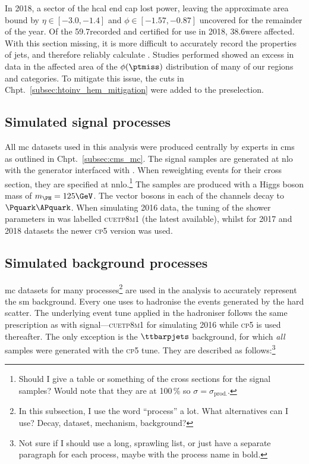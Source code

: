 In 2018, a sector of the \acrshort{hcal} end cap lost power, leaving the approximate area bound by $\eta \in [-\text{3.0}, -\text{1.4}]$ and $\phi \in [-\text{1.57}, -\text{0.87}]$ uncovered for the remainder of the year. Of the 59.7\fbinv recorded and certified for use in 2018, 38.6\fbinv were affected. With this section missing, it is more difficult to accurately record the properties of \glspl{jet}, and therefore reliably calculate \ptmiss. Studies performed showed an excess in data in the affected area of the $\phi(\ptmiss)$ distribution of many of our regions and categories. To mitigate this issue, the cuts in Chpt.~\ref{subsec:htoinv_hem_mitigation} were added to the preselection.




\subsection{Simulated signal processes}
\label{subsec:htoinv_signal}

All \acrlong{mc} datasets used in this analysis were produced centrally by experts in \acrshort{cms} as outlined in Chpt.~\ref{subsec:cms_mc}. The signal samples are generated at \acrshort{nlo} with the \POWHEG generator interfaced with \PYTHIAEIGHT. When reweighting events for their cross section, they are specified at \acrshort{nnlo}.\footnote{Should I give a table or something of the cross sections for the signal samples? Would note that they are at 100\,\% \BR so $\sigma = \sigma_{\mathrm{prod.}}$.} The samples are produced with a Higgs boson mass of $m_{\PH} = \text{125}\GeV$. The vector bosons in each of the \VH channels decay to $\Pquark\APquark$. When simulating 2016 data, the tuning of the shower parameters in \PYTHIA was labelled \textsc{cuetp8m1} (the latest available), whilst for 2017 and 2018 datasets the newer \textsc{cp5} version was used.




\subsection{Simulated background processes}
\label{subsec:htoinv_background}

\acrlong{mc} datasets for many processes\footnote{In this subsection, I use the word ``process'' a lot. What alternatives can I use? Decay, dataset, mechanism, background?} are used in the analysis to accurately represent the \acrlong{sm} background. Every one uses \PYTHIAEIGHT to hadronise the events generated by the hard scatter. The underlying event tune applied in the hadroniser follows the same prescription as with signal---\textsc{cuetp8m1} for simulating 2016 while \textsc{cp5} is used thereafter. The only exception is the $\ttbarpjets$ background, for which \emph{all} samples were generated with the \textsc{cp5} tune. They are described as follows:\footnote{Not sure if I should use a long, sprawling list, or just have a separate paragraph for each process, maybe with the process name in bold.}

